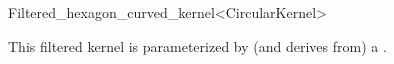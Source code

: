 \begin{ccRefClass}{Filtered_hexagon_curved_kernel<CircularKernel>}

\ccDefinition


\ccIsModel


\ccParameters

This filtered kernel is parameterized by (and derives from) a . 

\end{ccRefClass}

